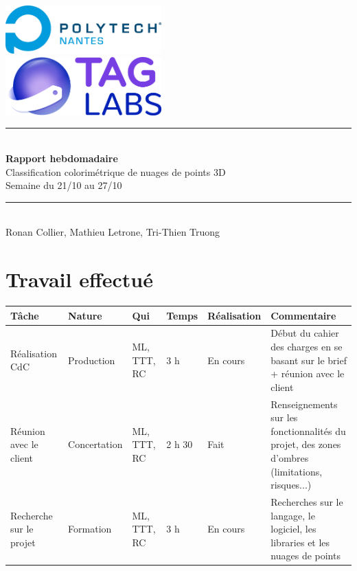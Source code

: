 \documentclass[12pt,titlepage,french]{article}
\begin{document}

\begin{titlepage}
\newcommand{\HRule}{\rule{\linewidth}{0.5mm}}
\center

  \includegraphics[width=0.45\textwidth]{img/image2.png}\\[1cm]
   
  \includegraphics[width=0.45\textwidth]{img/image1.png}


\HRule \\[0.4cm]
{ \huge \bfseries Rapport hebdomadaire\\[0.15cm] }
Classification colorimétrique de nuages de points 3D\\
Semaine du 21/10 au 27/10
\HRule \\[1.5cm]
Ronan Collier,
Mathieu Letrone,
Tri-Thien Truong
\\[1cm]
\end{titlepage}

\section{Travail effectué}

\noindent\begin{tabularx}{17cm}{|p{2.5cm}|p{2.5cm}|p{1cm}|p{1.5cm}|p{2.5cm}|X|}
    \hline
    \textbf{Tâche} & \textbf{Nature} & \textbf{Qui} & \textbf{Temps} & \textbf{Réalisation} & \textbf{Commentaire} \\
    \hline
    Réalisation CdC & Production & ML, TTT, RC & 3 h & En cours &  Début du cahier des charges en se basant sur le brief + réunion avec le client\\
    \hline
    Réunion avec le client & Concertation & ML, TTT, RC & 2 h 30 & Fait & Renseignements sur les fonctionnalités du projet, des zones d'ombres (limitations, risques...) \\
    \hline
    Recherche sur le projet & Formation & ML, TTT, RC & 3 h & En cours & Recherches sur le langage, le logiciel, les libraries et les nuages de points \\
    \hline
\end{tabularx}
\end{document}
